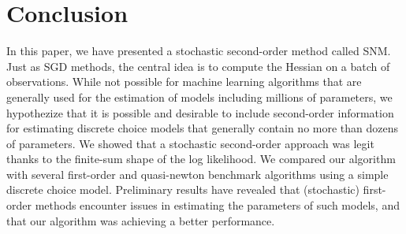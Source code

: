 \documentclass[conference]{IEEEtran}
\begin{document}
\section{Conclusion}
\label{sec:conclusion}

In this paper, we have presented a stochastic second-order method called SNM.  Just as SGD methods, the central idea is to compute the Hessian on a batch of observations. While not possible for machine learning algorithms that are generally used for the estimation of models including millions of parameters,  we hypothezize that it is possible and desirable to include second-order information for estimating discrete choice models that generally contain no more than dozens of parameters. We showed that a stochastic second-order approach was legit thanks to the finite-sum shape of the log likelihood. We compared our algorithm with several first-order and quasi-newton benchmark algorithms using a simple discrete choice model. Preliminary results have revealed that (stochastic) first-order methods encounter issues in estimating the parameters of such models, and that our algorithm was achieving a better performance.  
\end{document}
